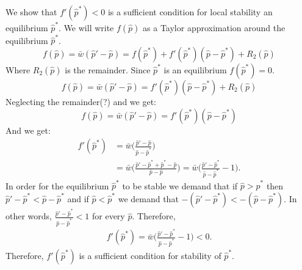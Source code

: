 \documentclass[12pt]{extarticle}
\begin{document}
\begin{appendices}
We show that $f'(\hat{p}^*)<0$ is a sufficient condition for local stability an equilibrium $\hat{p}^*$.
We will write $f(\hat{p})$ as a Taylor approximation around the equilibrium $\hat{p}^*$. 
\begin{equation} \label{eq:appendix_b_taylor}
  f(\hat{p}) = \bar{w}(\hat{p}'-\hat{p}) = f(\hat{p}^*) + f'(\hat{p}^*)(\hat{p}-\hat{p}^*) + R_2(\hat{p})
\end{equation}
Where $R_2(\hat{p})$ is the remainder. Since $\hat{p}^*$ is an equilibrium $f(\hat{p}^*)=0$.
\begin{equation} \label{eq:appendix_b_taylor0}
  f(\hat{p}) = \bar{w}(\hat{p}'-\hat{p}) =  f'(\hat{p}^*)(\hat{p}-\hat{p}^*) + R_2(\hat{p})
\end{equation}
Neglecting the remainder(?) and we get: 
\begin{equation} \label{eq:appendix_b_taylor_without_remainder}
  f(\hat{p}) = \bar{w}(\hat{p}'-\hat{p}) = f'(\hat{p}^*)(\hat{p}-\hat{p}^*)
\end{equation}
And we get:
\begin{equation} \label{eq:appendix_b_derivative}
  \begin{aligned}
  f'(\hat{p}^*) &= \bar{w}\Big(\frac{\hat{p}'-\hat{p}}{\hat{p}-\hat{p}^*}\Big)\\
  & = \bar{w}\Big(\frac{\hat{p}'-\hat{p}^*+\hat{p}^*-\hat{p}}{\hat{p}-\hat{p}}\Big) 
  = \bar{w}\Big(\frac{\hat{p}'-\hat{p}^*}{\hat{p}-\hat{p}^*}-1\Big) .
  \end{aligned}
\end{equation}
In order for the equilibrium $\hat{p}^*$ to be stable we demand that if $\hat{p} > \hat{p}^*$ then $\hat{p}'-\hat{p}^* < \hat{p}-\hat{p}^*$
and if $\hat{p} < \hat{p}^*$ we demand that $-(\hat{p}'-\hat{p}^*) < -(\hat{p}-\hat{p}^*)$. 
In other words, $\frac{\hat{p}'-\hat{p}^*}{\hat{p}-\hat{p}^*}<1$ for every $\hat{p}$.
Therefore,
\begin{equation} \label{eq:appendix_b_condition}
  \begin{aligned}
  f'(\hat{p}^*) = \bar{w}\Big(\frac{\hat{p}'-\hat{p}^*}{\hat{p}-\hat{p}^*}-1\Big) < 0 .
  \end{aligned}
\end{equation}
Therefore, $f'(\hat{p}^*)$ is a sufficient condition for stability of $\hat{p}^*$.

\end{appendices}



\end{document}
